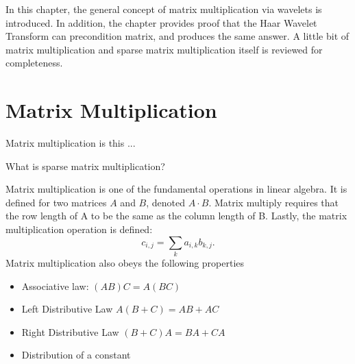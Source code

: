 


%

In this chapter, the general concept of matrix multiplication via wavelets is introduced.  In addition,  the chapter provides proof that the Haar Wavelet Transform can precondition matrix, and produces the same answer.  A little bit of matrix multiplication and sparse matrix multiplication itself is reviewed for completeness.  


\section{Matrix Multiplication}

Matrix multiplication is this ...

What is sparse matrix multiplication?

Matrix multiplication is one of the fundamental operations in linear algebra.  It is defined for two matrices $A$ and $B$, denoted $A\cdot B$.  Matrix multiply requires that the row length of A to be the same as the column length of B.  Lastly, the matrix multiplication operation is defined:
\[
c_{i,j} = \sum\limits_k a_{i,k} b_{k,j}.
\]
Matrix multiplication also obeys the following properties
\begin{itemize}
\item Associative law:  $(AB)C = A(BC)$
\item Left Distributive Law $A (B+C) = AB + AC$
\item Right Distributive Law $(B+C)A = BA + CA$
\item Distribution of a constant
\end{itemize} \cite {lipschutz}

